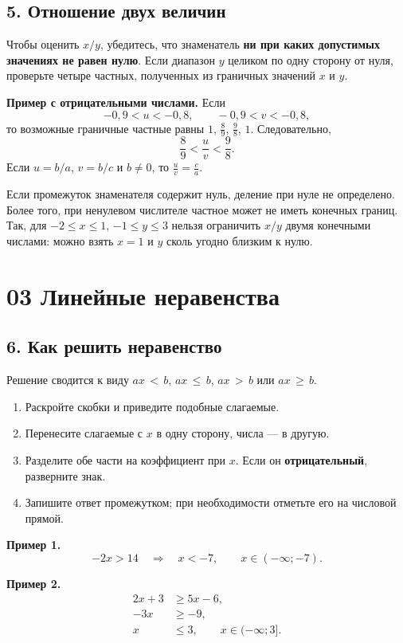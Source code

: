 \documentclass[a4paper,12pt]{article}
\newcommand{\key}[1]{\textbf{\textcolor{darkaccent}{#1}}}
\newcommand{\note}[1]{\par\smallskip{\color{darkaccent}\bfseries Обратите внимание.}\enspace #1\par\smallskip}
\begin{document}
\subsection*{5. Отношение двух величин}
Чтобы оценить $x/y$, убедитесь, что знаменатель \key{ни при каких допустимых значениях не равен нулю}. Если диапазон $y$ целиком по одну сторону от нуля, проверьте четыре частных, полученных из граничных значений $x$ и $y$.

\key{Пример с отрицательными числами.} Если
\[
-0{,}9<u<-0{,}8,\qquad -0{,}9<v<-0{,}8,
\]
то возможные граничные частные равны $1$, $\frac89$, $\frac98$, $1$. Следовательно,
\[
\boxed{\frac89<\frac uv<\frac98}.
\]
Если $u=b/a$, $v=b/c$ и $b\ne0$, то $\frac uv=\frac ca$.

\note{Если промежуток знаменателя содержит нуль, деление при нуле не определено. Более того, при ненулевом числителе частное может не иметь конечных границ. Так, для $-2\le x\le1$, $-1\le y\le3$ нельзя ограничить $x/y$ двумя конечными числами: можно взять $x=1$ и $y$ сколь угодно близким к нулю.}
\clearpage

\section*{03 \quad Линейные неравенства}
\subsection*{6. Как решить неравенство}
Решение сводится к виду $ax\,<\,b$, $ax\,\le\,b$, $ax\,>\,b$ или $ax\,\ge\,b$.
\begin{enumerate}
\item Раскройте скобки и приведите подобные слагаемые.
\item Перенесите слагаемые с $x$ в одну сторону, числа --- в другую.
\item Разделите обе части на коэффициент при $x$. Если он \key{отрицательный}, разверните знак.
\item Запишите ответ промежутком; при необходимости отметьте его на числовой прямой.
\end{enumerate}

\key{Пример 1.}
\[
-2x>14\quad\Longrightarrow\quad\boxed{x<-7},
\qquad x\in(-\infty;-7).
\]

\key{Пример 2.}
\[
\begin{aligned}
2x+3&\ge5x-6,\\
-3x&\ge-9,\\
x&\le3,\qquad x\in(-\infty;3].
\end{aligned}
\]
\end{document}
